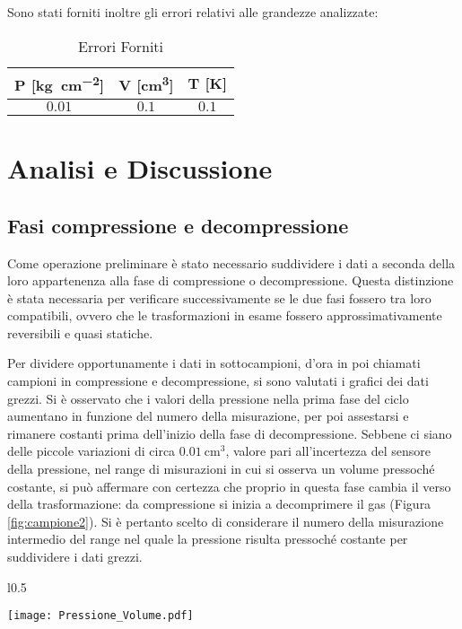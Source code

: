 \documentclass[a4paper,11pt,oneside]{article}
\begin{document}
Sono stati forniti inoltre gli errori relativi alle grandezze analizzate:
\begin{table}[h!]
    \centering
    \begin{tabular}{|c|c|c|}
        \hline
        P [\si{\kilogram\per\centi\meter\squared}] & V [\si{\centi\meter\cubed}] & T [\si{\kelvin}] \\ \hline
        \rowcolor[rgb]{0.85,0.85,0.85}$0.01$ & $0.1$ & $0.1$ \\ \hline
    \end{tabular}
    \caption{Errori Forniti}
    \label{tab:errori_forniti}
\end{table}

\section{Analisi e Discussione}
\subsection{Fasi compressione e decompressione}\label{par:compress}
Come operazione preliminare è stato necessario suddividere i dati a seconda della loro appartenenza alla fase di compressione o decompressione. Questa distinzione è stata necessaria per verificare successivamente se le due fasi fossero tra loro compatibili, ovvero che le trasformazioni in esame fossero approssimativamente reversibili e quasi statiche.

Per dividere opportunamente i dati in sottocampioni, d'ora in poi chiamati campioni in compressione e decompressione, si sono valutati i grafici dei dati grezzi. Si è osservato che i valori della pressione nella prima fase del ciclo aumentano in funzione del numero della misurazione, per poi assestarsi e rimanere costanti prima dell'inizio della fase di decompressione. Sebbene ci siano delle piccole variazioni di circa $\SI{0.01}{\centi\meter\cubed}$, valore pari all'incertezza del sensore della pressione,  nel range di misurazioni in cui si osserva un volume pressoché costante, si può affermare con certezza che proprio in questa fase cambia il verso della trasformazione: da compressione si inizia a decomprimere il gas (Figura \ref{fig:campione2}). Si è pertanto scelto di considerare il numero della misurazione intermedio del range nel quale la pressione risulta pressoché costante per suddividere i dati grezzi.
\begin{wrapfigure}{l}{0.5\textwidth}
  \begin{center}
    \texttt{[image: Pressione\_Volume.pdf]}
  \end{center}
  \caption{Pressioni e Volumi Primo Campione}
  \label{fig:campione2}
\end{wrapfigure}
\end{document}
